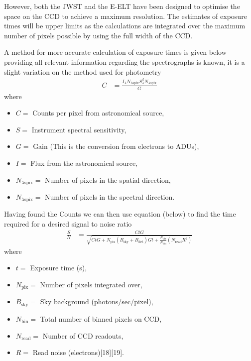 		However, both the JWST and the E-ELT have been designed to optimise the space on the CCD to achieve a maximum resolution. The estimates of exposure times will be upper limits as the calculations are integrated over the maximum number of pixels possible by using the full width of the CCD.

		A method for more accurate calculation of exposure times is given below providing all relevant information regarding the spectrographs is known, it is a slight variation on the method used for photometry
		\begin{align}
			C &= \frac{I_\lambda N_{\lambda \text{spix}}S_\lambda^d N_{\lambda \text{spix}}}{G}
		\end{align}
		where
		\begin{itemize}
			\item $C =$ Counts per pixel from astronomical source,
			\item $S =$ Instrument spectral sensitivity,
			\item $G =$ Gain (This is the conversion from electrons to ADUs),
			\item $I =$ Flux from the astronomical source,
			\item $N_{\lambda \text{spix}} =$ Number of pixels in the spatial direction,
			\item $N_{\lambda \text{spix}} =$ Number of pixels in the spectral direction.
		\end{itemize}
		Having found the Counts we can then use equation (below) to find the time required for a desired signal to noise ratio
		\begin{align}
			\frac{S}{N} &= \frac{CtG}{\sqrt{CtG + N_\text{pix}(B_\text{sky} + B_\text{det}) Gt + \frac{N_\text{pix}}{N_\text{bin}}(N_\text{read} R^2)}}
		\end{align}
		where
		\begin{itemize}
			\item $t =$ Exposure time (s),
			\item $N_\text{pix} =$ Number of pixels integrated over,
			\item $B_\text{sky} =$ Sky background (photons/sec/pixel),
			\item $N_\text{bin} =$ Total number of binned pixels on CCD,
			\item $N_\text{read} =$ Number of CCD readouts,
			\item $R =$ Read noise (electrons)\cite{}[18]\cite{}[19].
		\end{itemize}

